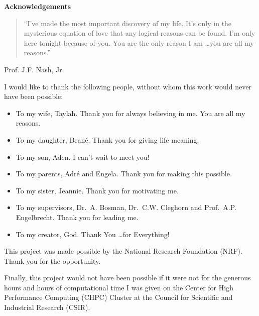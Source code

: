 \pagestyle{empty}
\begin{center}
    \Large
    \textbf{Acknowledgements}
\end{center}

\begin{quotation}
    \noindent
    ``I've made the most important discovery of my life. It's only in
    the mysterious equation of love that any logical reasons can be found. I'm
    only here tonight because of you. You are the only reason I am \ldots you are
    all my reasons.''
\end{quotation}
\begin{flushright}
    Prof. J.F. Nash, Jr.
\end{flushright}

\vspace{0.3cm}
\noindent
I would like to thank the following people, without whom this work would never
have been possible:

\begin{itemize}
    \item
    To my wife, Taylah. Thank you for always believing in me. You are all my
    reasons.

    \item
        To my daughter, Bean\'e. Thank you for giving life meaning.
        
    \item
        To my son, Aden. I can't wait to meet you!

    \item
        To my parents, Adr\'e and Engela. Thank you for making this possible.

    \item
    To my sister, Jeannie. Thank you for motivating me.

    \item
    To my supervisors, Dr.~A. Bosman, Dr.~C.W. Cleghorn and Prof.~A.P. Engelbrecht. Thank you
    for leading me.

    \item
    To my creator, God. Thank You \ldots for Everything!
\end{itemize}

\vspace{\fill}

\begin{center}
    This project was made possible by the National Research Foundation (NRF).\\
    Thank you for the opportunity.
\end{center}

\vspace{\fill}

\begin{center}
    Finally, this project would not have been possible if it were not for the generous hours and hours of computational time I was given on the Center for High Performance Computing (CHPC) Cluster at the Council for Scientific and Industrial Research (CSIR).
\end{center}

\newpage
